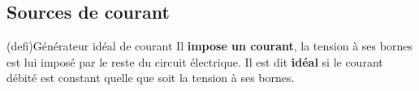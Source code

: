 \documentclass[../../main/main.tex]{subfiles}
\begin{document}
\subsection{Sources de courant}

\begin{tcb*}[label=def:gentens, sidebyside, righthand ratio=.2](defi){Générateur
			idéal de courant}
	Il \textbf{impose un courant}, la tension à ses bornes est lui imposé par le
	reste du circuit électrique. Il est dit \textbf{idéal} si le courant débité
	est constant quelle que soit la tension à ses bornes.
	\tcblower
	\vspace{-10pt}
	\begin{center}
		\vspace{-10pt}
	\end{center}
\end{tcb*}
\end{document}
